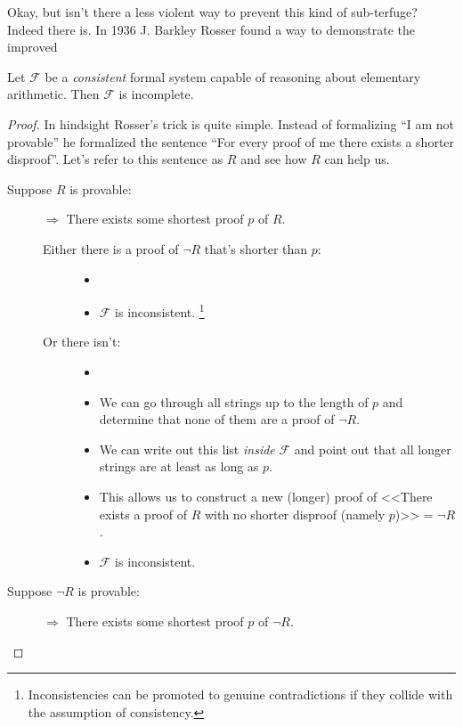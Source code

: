 \documentclass{article}
\theoremstyle{customstyle}
\newcommand{\F}{\ensuremath{\mathcal{F}}}
\begin{document}
Okay, but isn't there a less violent way to prevent this kind of sub-terfuge? Indeed there is. In 1936 J. Barkley Rosser found a way to demonstrate the improved

\begin{theorem}
Let $\F$ be a \textit{consistent} formal system capable of reasoning about elementary arithmetic. Then $\F$ is incomplete.
\end{theorem}

\begin{proof}\vspace{-\topsep}
In hindsight Rosser's trick is quite simple. Instead of formalizing ``I am not provable'' he formalized the sentence ``For every proof of me there exists a shorter disproof''. Let's refer to this sentence as $R$ and see how $R$ can help us.
\begin{description}
\item[Suppose $R$ is provable:]
$\Rightarrow$ There exists some shortest proof $p$ of $R$.
\begin{description}
\item[Either there is a proof of $\neg R$ that's shorter than $p$:]
\begin{itemize}
\item[]
\item $\F$ is inconsistent. \lightning\footnote{Inconsistencies can be promoted to genuine contradictions if they collide with the assumption of consistency.}
\end{itemize}
\item[Or there isn't:]
\begin{itemize}
\item[]
\item We can go through all strings up to the length of $p$ and determine that none of them are a proof of $\neg R$.
\item We can write out this list \textit{inside} $\F$ and point out that all longer strings are at least as long as $p$.
\item This allows us to construct a new (longer) proof of <<There exists a proof of $R$ with no shorter disproof (namely $p$)>> = $\neg R$.
\item $\F$ is inconsistent. \lightning
\end{itemize}
\end{description}
\item[Suppose $\neg R$ is provable:]
$\Rightarrow$ There exists some shortest proof $p$ of $\neg R$.
\begin{description}

\end{description}
\end{description}
\end{proof}
\end{document}
